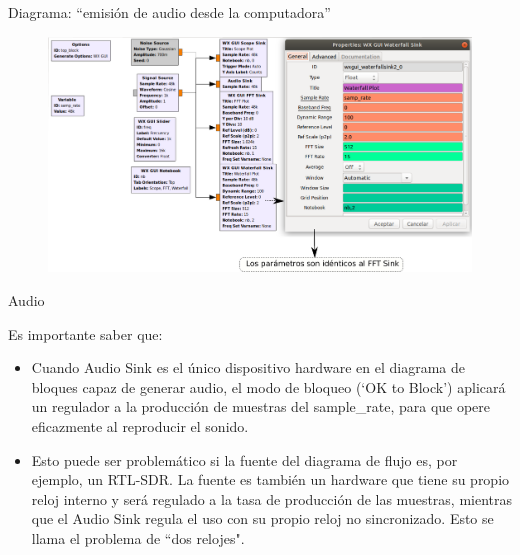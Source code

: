 \begin{frame}{Diagrama:  “emisión de audio desde la computadora”}

\begin{figure}

\begin{center}
\vspace{-8mm}
\includegraphics[width=1.05\textwidth]{parte1/lab3/pdf/lab3_4.pdf}
\end{center}
\end{figure}

\end{frame}

\begin{frame}{Audio}

Es importante saber que:\\
\begin{itemize}
    \item
    {Cuando Audio Sink es el único dispositivo hardware en el diagrama de bloques capaz de generar audio, el modo de bloqueo (‘OK to Block’) aplicará un regulador a la producción de muestras del sample\_rate, para que opere eficazmente al reproducir el sonido\cite{Seeber2014}.}
    \item
    {Esto puede ser problemático si la fuente del diagrama de flujo es, por ejemplo, un RTL-SDR. La fuente es también un hardware que tiene su propio reloj interno y será regulado a la tasa de producción de las muestras, mientras que el Audio Sink regula el uso con su propio reloj no sincronizado. Esto se llama el problema de “dos relojes".}
\end{itemize}
\end{frame}

